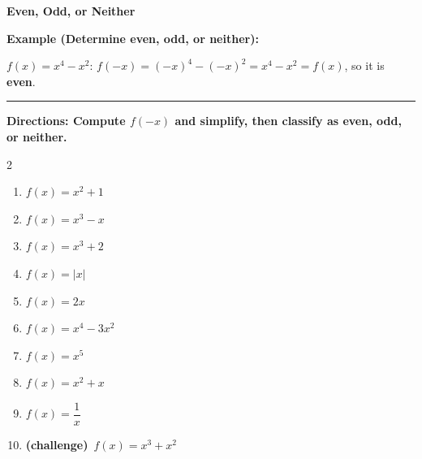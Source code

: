 \documentclass[12pt]{article}
\begin{document}
\vspace{0.35cm}

\begin{center}{\Large \textbf{Even, Odd, or Neither}}\end{center}\vspace{0.2cm}
\textbf{Example (Determine even, odd, or neither):}

$f(x)=x^{4}-x^{2}$: $f(-x)=(-x)^4-(-x)^2=x^4-x^2=f(x)$, so it is \textbf{even}.

\vspace{0.2cm}\hrule\vspace{0.35cm}
\textbf{Directions: Compute $f(-x)$ and simplify, then classify as even, odd, or neither.}

\begin{multicols}{2}
\begin{enumerate}[label=\textbf{\arabic*.}, start=1, itemsep=2cm]
  \item $\displaystyle f(x)=x^{2}+1$
  \item $\displaystyle f(x)=x^{3}-x$
  \item $\displaystyle f(x)=x^{3}+2$
  \item $\displaystyle f(x)=|x|$
  \item $\displaystyle f(x)=2x$
  \item $\displaystyle f(x)=x^{4}-3x^{2}$
  \item $\displaystyle f(x)=x^{5}$
  \item $\displaystyle f(x)=x^{2}+x$
  \item $\displaystyle f(x)=\dfrac{1}{x}$
  \item \textbf{(challenge)}\ $\displaystyle f(x)=x^{3}+x^{2}$
\end{enumerate}
\end{multicols}
\end{document}
